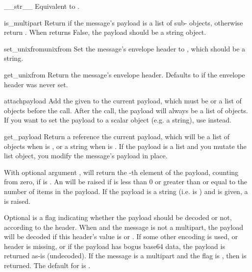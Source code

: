 \begin{methoddesc}[Message]{__str__}{}
Equivalent to .
\end{methoddesc}

\begin{methoddesc}[Message]{is_multipart}{}
Return  if the message's payload is a list of
sub- objects, otherwise return .  When
 returns False, the payload should be a string
object.
\end{methoddesc}

\begin{methoddesc}[Message]{set_unixfrom}{unixfrom}
Set the message's envelope header to , which should be a string.
\end{methoddesc}

\begin{methoddesc}[Message]{get_unixfrom}{}
Return the message's envelope header.  Defaults to  if the
envelope header was never set.
\end{methoddesc}

\begin{methoddesc}[Message]{attach}{payload}
Add the given  to the current payload, which must be
 or a list of  objects before the call.
After the call, the payload will always be a list of 
objects.  If you want to set the payload to a scalar object (e.g. a
string), use  instead.
\end{methoddesc}

\begin{methoddesc}[Message]{get_payload}{}
Return a reference the current payload, which will be a list of
 objects when  is , or a
string when  is .  If the
payload is a list and you mutate the list object, you modify the
message's payload in place.

With optional argument ,  will return the
-th element of the payload, counting from zero, if
 is .  An 
will be raised if  is less than 0 or greater than or equal to
the number of items in the payload.  If the payload is a string
(i.e.  is ) and  is given, a
 is raised.

Optional  is a flag indicating whether the payload should be
decoded or not, according to the  header.
When  and the message is not a multipart, the payload will be
decoded if this header's value is  or
.  If some other encoding is used, or
 header is
missing, or if the payload has bogus base64 data, the payload is
returned as-is (undecoded).  If the message is a multipart and the
 flag is , then  is returned.  The
default for  is .
\end{methoddesc}

